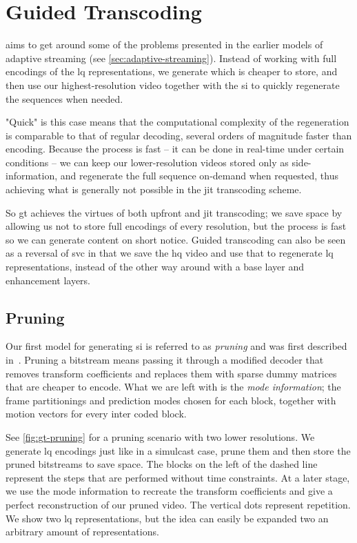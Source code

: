 \chapter{Guided Transcoding}

 aims to get around some of the problems presented in the earlier models of adaptive streaming (see \cref{sec:adaptive-streaming}). Instead of working with full encodings of the \gls{lq} representations, we generate  which is cheaper to store, and then use our highest-resolution video together with the \gls{si} to quickly regenerate the sequences when needed.

"Quick" is this case means that the computational complexity of the regeneration is comparable to that of regular decoding, several orders of magnitude faster than encoding. Because the process is fast -- it can be done in real-time under certain conditions -- we can keep our lower-resolution videos stored only as side-information, and regenerate the full sequence on-demand when requested, thus achieving what is generally not possible in the \gls{jit} transcoding scheme.

So \gls{gt} achieves the virtues of both upfront and \gls{jit} transcoding; we save space by allowing us not to store full encodings of every resolution, but the process is fast so we can generate content on short notice. Guided transcoding can also be seen as a reversal of \gls{svc} in that we save the \gls{hq} video and use that to regenerate \gls{lq} representations, instead of the other way around with a base layer and enhancement layers.

\section{Pruning}
\label{sec:pruning}
Our first model for generating \gls{si} is referred to as \textit{pruning} and was first described in~\cite{Van_Wallendael}. Pruning a bitstream means passing it through a modified decoder that removes transform coefficients and replaces them with sparse dummy matrices that are cheaper to encode. What we are left with is the \textit{mode information}; the frame partitionings and prediction modes chosen for each block, together with motion vectors for every inter coded block.

See \cref{fig:gt-pruning} for a pruning scenario with two lower resolutions. We generate \gls{lq} encodings just like in a simulcast case, prune them and then store the pruned bitstreams to save space. The blocks on the left of the dashed line represent the steps that are performed without time constraints. At a later stage, we use the mode information to recreate the transform coefficients and give a perfect reconstruction of our pruned video. The vertical dots represent repetition. We show two \gls{lq} representations, but the idea can easily be expanded two an arbitrary amount of representations.

